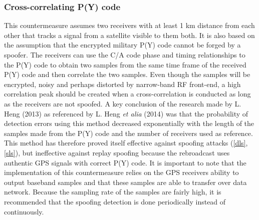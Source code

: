 \documentclass[12pt,english,a4paper]{article}
\begin{document}
\subsubsection{Cross-correlating P(Y) code}
This countermeasure assumes two receivers with at least 1 km distance from each other that tracks a signal from a satellite visible to them both. It is also based on the assumption that the encrypted military P(Y) code cannot be forged by a spoofer. The receivers can use the C/A code phase and timing relationships to the P(Y) code to obtain two samples from the same time frame of the received P(Y) code and then correlate the two samples. Even though the samples will be encrypted, noisy and perhaps distorted by narrow-band RF front-end, a high correlation peak should be created when a cross-correlation is conducted as long as the receivers are not spoofed. A key conclusion of the research made by L. Heng (2013) as referenced by L. Heng \textit{et alia} (2014) was that the probability of detection errors using this method decreased exponentially with the length of the samples made from the P(Y) code and the number of receivers used as reference. This method has therefore proved itself effective against spoofing attacks (\ref{dls},\ref{sls}), but ineffective against replay spoofing because the rebroadcast uses authentic GPS signals with correct P(Y) code. It is important to note that the implementation of this countermeasure relies on the GPS receivers ability to output baseband samples and that these samples are able to transfer over data network. Because the sampling rate of the samples are fairly high, it is recommended that the spoofing detection is done periodically instead of continuously. \cite{HengChouGao14}  
\newpage
\printbibliography[title={Complete Bibliography},heading=bibintoc]
\end{document}
